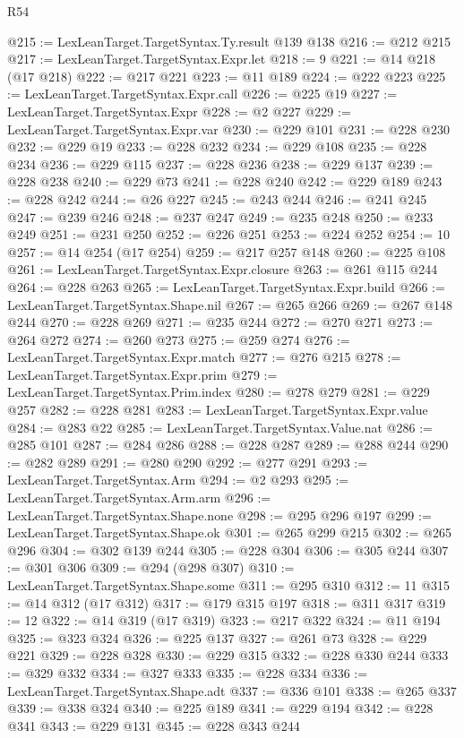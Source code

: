 \begin{lexlean}{R54}
\begin{coremodule}
@215 := LexLeanTarget.TargetSyntax.Ty.result @139 @138
@216 := @212 @215
@217 := LexLeanTarget.TargetSyntax.Expr.let
@218 := 9
@221 := @14 @218 (@17 @218)
@222 := @217 @221
@223 := @11 @189
@224 := @222 @223
@225 := LexLeanTarget.TargetSyntax.Expr.call
@226 := @225 @19
@227 := LexLeanTarget.TargetSyntax.Expr
@228 := @2 @227
@229 := LexLeanTarget.TargetSyntax.Expr.var
@230 := @229 @101
@231 := @228 @230
@232 := @229 @19
@233 := @228 @232
@234 := @229 @108
@235 := @228 @234
@236 := @229 @115
@237 := @228 @236
@238 := @229 @137
@239 := @228 @238
@240 := @229 @73
@241 := @228 @240
@242 := @229 @189
@243 := @228 @242
@244 := @26 @227
@245 := @243 @244
@246 := @241 @245
@247 := @239 @246
@248 := @237 @247
@249 := @235 @248
@250 := @233 @249
@251 := @231 @250
@252 := @226 @251
@253 := @224 @252
@254 := 10
@257 := @14 @254 (@17 @254)
@259 := @217 @257 @148
@260 := @225 @108
@261 := LexLeanTarget.TargetSyntax.Expr.closure
@263 := @261 @115 @244
@264 := @228 @263
@265 := LexLeanTarget.TargetSyntax.Expr.build
@266 := LexLeanTarget.TargetSyntax.Shape.nil
@267 := @265 @266
@269 := @267 @148 @244
@270 := @228 @269
@271 := @235 @244
@272 := @270 @271
@273 := @264 @272
@274 := @260 @273
@275 := @259 @274
@276 := LexLeanTarget.TargetSyntax.Expr.match
@277 := @276 @215
@278 := LexLeanTarget.TargetSyntax.Expr.prim
@279 := LexLeanTarget.TargetSyntax.Prim.index
@280 := @278 @279
@281 := @229 @257
@282 := @228 @281
@283 := LexLeanTarget.TargetSyntax.Expr.value
@284 := @283 @22
@285 := LexLeanTarget.TargetSyntax.Value.nat
@286 := @285 @101
@287 := @284 @286
@288 := @228 @287
@289 := @288 @244
@290 := @282 @289
@291 := @280 @290
@292 := @277 @291
@293 := LexLeanTarget.TargetSyntax.Arm
@294 := @2 @293
@295 := LexLeanTarget.TargetSyntax.Arm.arm
@296 := LexLeanTarget.TargetSyntax.Shape.none
@298 := @295 @296 @197
@299 := LexLeanTarget.TargetSyntax.Shape.ok
@301 := @265 @299 @215
@302 := @265 @296
@304 := @302 @139 @244
@305 := @228 @304
@306 := @305 @244
@307 := @301 @306
@309 := @294 (@298 @307)
@310 := LexLeanTarget.TargetSyntax.Shape.some
@311 := @295 @310
@312 := 11
@315 := @14 @312 (@17 @312)
@317 := @179 @315 @197
@318 := @311 @317
@319 := 12
@322 := @14 @319 (@17 @319)
@323 := @217 @322
@324 := @11 @194
@325 := @323 @324
@326 := @225 @137
@327 := @261 @73
@328 := @229 @221
@329 := @228 @328
@330 := @229 @315
@332 := @228 @330 @244
@333 := @329 @332
@334 := @327 @333
@335 := @228 @334
@336 := LexLeanTarget.TargetSyntax.Shape.adt
@337 := @336 @101
@338 := @265 @337
@339 := @338 @324
@340 := @225 @189
@341 := @229 @194
@342 := @228 @341
@343 := @229 @131
@345 := @228 @343 @244

\end{coremodule}
\end{lexlean}

